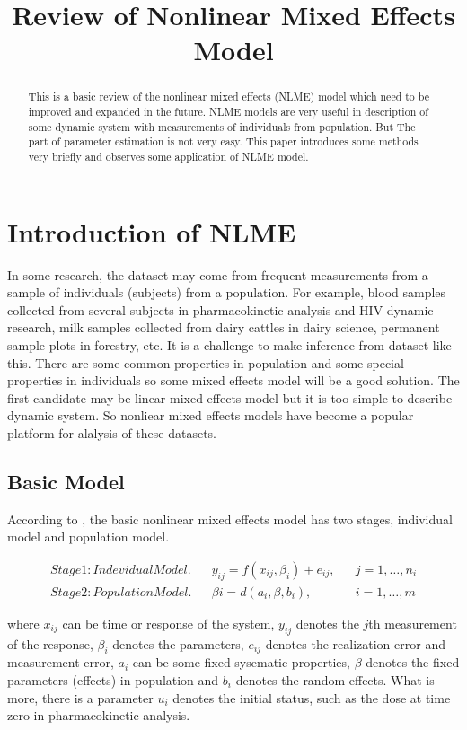 \documentclass[12pt]{extarticle}
\title{Review of Nonlinear Mixed Effects Model}
\begin{document}
\maketitle
\begin{abstract}
This is a basic review of the nonlinear mixed effects (NLME) model which need to be improved and expanded in the future. NLME models are very useful in description of  some dynamic system with measurements of individuals from population. But The part of parameter estimation is not very easy. This paper introduces some methods very briefly and observes some application of NLME model.
\end{abstract}
\section{Introduction of NLME}
\label{sect:Introduction}
In some research, the dataset may come from frequent measurements from a sample of individuals (subjects) from a population. For example, blood samples collected from several subjects in pharmacokinetic analysis and HIV dynamic research, milk samples collected from dairy cattles in dairy science, permanent sample plots in forestry, etc. It is a challenge to make inference from dataset like this. There are some common properties in population and some special properties in individuals so some mixed effects model will be a good solution. 
The first candidate may be linear mixed effects model but it is too simple to describe dynamic system. So nonliear mixed effects models have become a popular platform for alalysis of these datasets.

\subsection{Basic Model}
\label{sect:basic}
According to \cite{Davidian03}, the basic nonlinear mixed effects model has two stages, individual model and population model.

\begin{align}
Stage 1: Indevidual Model. & & y_{ij} = f(x_{ij},\beta_{i})+e_{ij}, & & j=1,\ldots,n_{i} \label{im1} \\
Stage 2: Population Model.  & & \beta{i} = d(a_{i},\beta,b_{i}), & & i=1,\ldots,m \label{pm1} 
\end{align}

where $x_{ij}$ can be time or response of the system, $y_{ij}$ denotes the $j$th measurement of the response, $\beta_{i}$ denotes the parameters, $e_{ij}$ denotes the realization error and measurement error, $a_{i}$ can be some fixed sysematic properties, $\beta$ denotes the fixed parameters (effects) in population and $b_{i}$ denotes the random effects. What is more, there is a parameter $u_i$ denotes the initial status, such as the dose at time zero in pharmacokinetic analysis.
\end{document}
